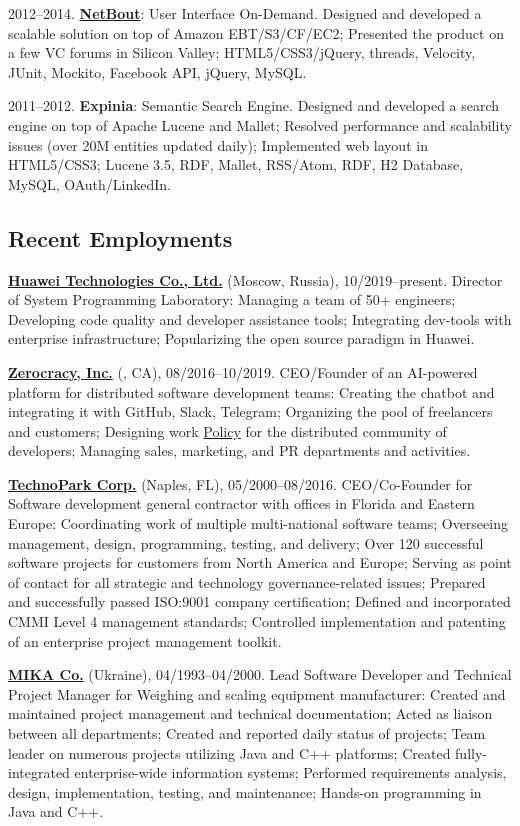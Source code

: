 \documentclass{yb}
\begin{document}
2012--2014. \href{https://www.netbout.com}{\textbf{NetBout}}: User Interface On-Demand.
Designed and developed a scalable solution on top of Amazon EBT/S3/CF/EC2;
Presented the product on a few VC forums in Silicon Valley;
HTML5/CSS3/jQuery, threads, Velocity, JUnit, Mockito, Facebook API, jQuery, MySQL.

2011--2012. \textbf{Expinia}: Semantic Search Engine.
Designed and developed a search engine on top of Apache Lucene and Mallet;
Resolved performance and scalability issues (over 20M entities updated daily);
Implemented web layout in HTML5/CSS3;
Lucene 3.5, RDF, Mallet, RSS/Atom, RDF, H2 Database, MySQL, OAuth/LinkedIn.

\subsection*{Recent Employments}

\textbf{\href{https://www.huawei.com}{Huawei Technologies Co., Ltd.}} (Moscow, Russia), 10/2019--present.
Director of System Programming Laboratory:
Managing a team of 50+ engineers;
Developing code quality and developer assistance tools;
Integrating dev-tools with enterprise infrastructure;
Popularizing the open source paradigm in Huawei.

\textbf{\href{https://www.zerocracy.com}{Zerocracy, Inc.}} (, CA), 08/2016--10/2019.
CEO/Founder of an AI-powered platform for distributed software development teams:
Creating the chatbot and integrating it with GitHub, Slack, Telegram;
Organizing the pool of freelancers and customers;
Designing work \href{https://www.zerocracy.com/policy.html}{Policy} for the distributed community of developers;
Managing sales, marketing, and PR departments and activities.

\textbf{\href{https://www.technoparkcorp.com}{TechnoPark Corp.}} (Naples, FL), 05/2000--08/2016.
CEO/Co-Founder for Software development general contractor with offices in Florida and Eastern Europe:
Coordinating work of multiple multi-national software teams;
Overseeing management, design, programming, testing, and delivery;
Over 120 successful software projects for customers from North America and Europe;
Serving as point of contact for all strategic and technology governance-related issues;
Prepared and successfully passed ISO:9001 company certification;
Defined and incorporated CMMI Level 4 management standards;
Controlled implementation and patenting of an enterprise project management toolkit.

\textbf{\href{https://www.mika.ua}{MIKA Co.}} (Ukraine), 04/1993--04/2000.
Lead Software Developer and Technical Project Manager for Weighing and scaling equipment manufacturer:
Created and maintained project management and technical documentation;
Acted as liaison between all departments;
Created and reported daily status of projects;
Team leader on numerous projects utilizing Java and C++ platforms;
Created fully-integrated enterprise-wide information systems;
Performed requirements analysis, design, implementation, testing, and maintenance;
Hands-on programming in Java and C++.
\end{document}
